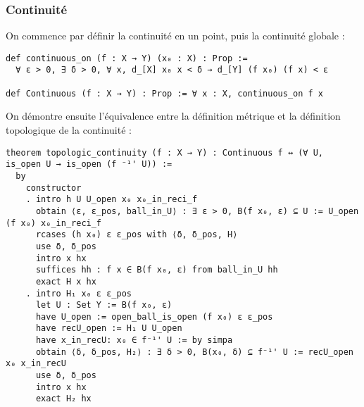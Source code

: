 \documentclass[a4paper, 12pt]{article}
\begin{document}
\subsubsection{Continuité}

On commence par définir la continuité en un point, puis la continuité globale :

\begin{verbatim}
def continuous_on (f : X → Y) (x₀ : X) : Prop :=
  ∀ ε > 0, ∃ δ > 0, ∀ x, d_[X] x₀ x < δ → d_[Y] (f x₀) (f x) < ε

def Continuous (f : X → Y) : Prop := ∀ x : X, continuous_on f x
\end{verbatim}

On démontre ensuite l'équivalence entre la définition métrique et la définition topologique de la continuité :

\begin{verbatim}
theorem topologic_continuity (f : X → Y) : Continuous f ↔ (∀ U, is_open U → is_open (f ⁻¹' U)) :=
  by
    constructor
    . intro h U U_open x₀ x₀_in_reci_f
      obtain ⟨ε, ε_pos, ball_in_U⟩ : ∃ ε > 0, B(f x₀, ε) ⊆ U := U_open (f x₀) x₀_in_reci_f
      rcases (h x₀) ε ε_pos with ⟨δ, δ_pos, H⟩
      use δ, δ_pos
      intro x hx
      suffices hh : f x ∈ B(f x₀, ε) from ball_in_U hh
      exact H x hx
    . intro H₁ x₀ ε ε_pos
      let U : Set Y := B(f x₀, ε)
      have U_open := open_ball_is_open (f x₀) ε ε_pos
      have recU_open := H₁ U U_open
      have x_in_recU: x₀ ∈ f⁻¹' U := by simpa
      obtain ⟨δ, δ_pos, H₂⟩ : ∃ δ > 0, B(x₀, δ) ⊆ f⁻¹' U := recU_open x₀ x_in_recU
      use δ, δ_pos
      intro x hx
      exact H₂ hx
\end{verbatim}
\end{document}
